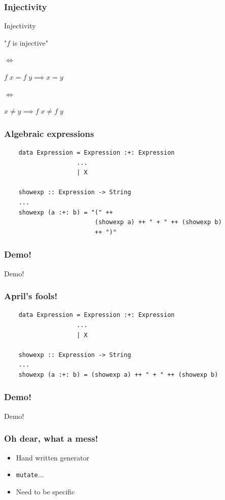 \documentclass{beamer}
\begin{document}
\begin{frame}
    \frametitle{Injectivity}
        \begin{block}{Injectivity}
            \centerline{"$f$ is injective"}
            \centerline{$\iff$}
            \centerline{$f\;x=f\;y\implies x = y$}
            \centerline{$\iff$}
            \centerline{$x \neq y \implies f\;x\neq f\;y$}
        \end{block}
\end{frame}

\begin{frame}[fragile]
    \frametitle{Algebraic expressions}
    \begin{verbatim}
    data Expression = Expression :+: Expression
                    ...
                    | X

    showexp :: Expression -> String
    ...
    showexp (a :+: b) = "(" ++
                         (showexp a) ++ " + " ++ (showexp b)
                         ++ ")"
    \end{verbatim}
\end{frame}

\begin{frame}
    \frametitle{Demo!}
        \Huge{\centerline{Demo!}}
\end{frame}

\begin{frame}[fragile]
    \frametitle{April's fools!}
    \begin{verbatim}
    data Expression = Expression :+: Expression
                    ...
                    | X

    showexp :: Expression -> String
    ...
    showexp (a :+: b) = (showexp a) ++ " + " ++ (showexp b)
    \end{verbatim}
\end{frame}

\begin{frame}
    \frametitle{Demo!}
        \Huge{\centerline{Demo!}}
\end{frame}

\begin{frame}
    \frametitle{Oh dear, what a mess!}
    \begin{itemize}
        \item Hand written generator
        \item \texttt{mutate}...
        \item Need to be specific
    \end{itemize}
\end{frame}
\end{document}
